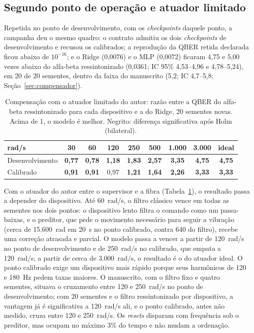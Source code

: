 \documentclass[12pt]{article}
\begin{document}
\subsection{Segundo ponto de operação e atuador limitado}

Repetida no ponto de desenvolvimento, com os \textit{checkpoints} daquele ponto,
a campanha deu o mesmo quadro: o contrato admitiu os dois \textit{checkpoints} de
desenvolvimento e recusou os calibrados; a reprodução da QBER retida declarada
ficou abaixo de $10^{-16}$; e o Ridge (0,0076) e o MLP (0,0072) ficaram 4,75 e
5,00 vezes abaixo do alfa-beta ressintonizado (0,0361; IC 95\% 4,53--4,96 e
4,78--5,24), em 20 de 20 sementes, dentro da faixa do manuscrito (5,2; IC
4,7--5,8; Seção~\ref{sec:compensador}).

\begin{table}[ht]
\centering
\caption{Compensação com o atuador limitado do autor: razão entre a QBER do
alfa-beta ressintonizado para cada dispositivo e a do Ridge, 20 sementes novas.
Acima de 1, o modelo é melhor. Negrito: diferença significativa após Holm
(bilateral).}
\label{tab:atuador}
\small
\begin{tabular}{lcccccccc}
\toprule
rad/s & 30 & 60 & 120 & 250 & 500 & 1.000 & 3.000 & ideal \\
\midrule
Desenvolvimento & \textbf{0,77} & \textbf{0,78} & \textbf{1,18} & \textbf{1,83} & \textbf{2,57} & \textbf{3,35} & \textbf{4,75} & \textbf{4,75} \\
Calibrado & \textbf{0,91} & \textbf{0,91} & 0,97 & \textbf{1,21} & \textbf{1,64} & \textbf{2,26} & \textbf{3,33} & \textbf{3,33} \\
\bottomrule
\end{tabular}
\end{table}

Com o atuador do autor entre o supervisor e a fibra
(Tabela~\ref{tab:atuador}), o resultado passa a depender do dispositivo. Até
60~rad/s, o filtro clássico vence em todas as sementes nos dois pontos: o
dispositivo lento filtra o comando como um passa-baixas, e o preditor, que pede
o movimento necessário para seguir a vibração (cerca de 15.600~rad em 20~s no
ponto calibrado, contra 640 do filtro), recebe uma correção atrasada e parcial.
O modelo passa a vencer a partir de 120~rad/s no ponto de desenvolvimento e de
250~rad/s no calibrado, que empata a 120~rad/s; a partir de cerca de
3.000~rad/s, o resultado é o do atuador ideal. O ponto calibrado exige um
dispositivo mais rápido porque seus harmônicos de 120 e 180~Hz pedem taxas
maiores. O manuscrito, com o filtro fixo e quatro sementes, situava o
cruzamento entre 120 e 250~rad/s no ponto de desenvolvimento; com 20 sementes e o
filtro ressintonizado por dispositivo, a vantagem já é significativa a
120~rad/s ali, e o ponto calibrado, antes não medido, cruza entre 120 e
250~rad/s. Os \textit{resets} disparam com frequência sob o preditor, mas ocupam
no máximo 3\% do tempo e não mudam a ordenação.
\end{document}
